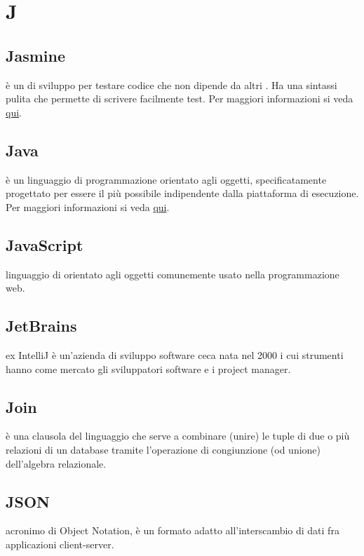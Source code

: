 \documentclass[12pt,a4paper]{article}
\begin{document}
\newpage

\section{J}

\subsection{Jasmine} 
è un  di sviluppo per testare codice  che non dipende da altri . Ha una sintassi pulita che permette di scrivere facilmente test. Per maggiori informazioni si veda \href{http://jasmine.github.io}{qui}.

\subsection{Java} 
 è un linguaggio di programmazione orientato agli oggetti, specificatamente progettato per essere il più possibile indipendente dalla piattaforma di esecuzione. Per maggiori informazioni si veda \href{https://it.wikipedia.org/wiki/Java_(linguaggio_di_programmazione)}{qui}.

\subsection{JavaScript} 
 linguaggio di  orientato agli oggetti comunemente usato nella programmazione web.
 
 \subsection{JetBrains}
ex IntelliJ è un'azienda di sviluppo software ceca nata nel 2000 i cui strumenti hanno come mercato gli sviluppatori software e i project manager.

\subsection{Join} 
 è una clausola del linguaggio  che serve a combinare (unire) le tuple di due o più relazioni di un database tramite l'operazione di congiunzione (od unione) dell'algebra relazionale.

\subsection{JSON} 
 acronimo di  Object Notation, è un formato adatto all'interscambio di dati fra applicazioni client-server.
\end{document}
